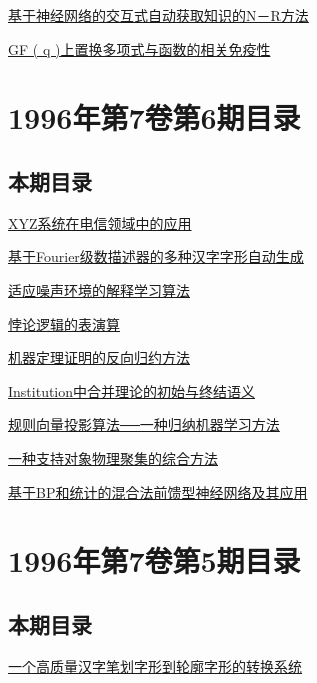 \documentclass[a4paper]{article}
\begin{document}
\href{http://www.jos.org.cn/ch/reader/download_pdf.aspx?file_no=19960708&year_id=1996&quarter_id=7&falg=1}{基于神经网络的交互式自动获取知识的N－R方法}

\href{http://www.jos.org.cn/ch/reader/download_pdf.aspx?file_no=19960709&year_id=1996&quarter_id=7&falg=1}{GF ( q )上置换多项式与函数的相关免疫性}


\section{\textbf{1996年第7卷第6期目录}}
\subsection{本期目录}
\href{http://www.jos.org.cn/ch/reader/download_pdf.aspx?file_no=19960601&year_id=1996&quarter_id=6&falg=1}{XYZ系统在电信领域中的应用}

\href{http://www.jos.org.cn/ch/reader/download_pdf.aspx?file_no=19960602&year_id=1996&quarter_id=6&falg=1}{基于Fourier级数描述器的多种汉字字形自动生成}

\href{http://www.jos.org.cn/ch/reader/download_pdf.aspx?file_no=19960603&year_id=1996&quarter_id=6&falg=1}{适应噪声环境的解释学习算法}

\href{http://www.jos.org.cn/ch/reader/download_pdf.aspx?file_no=19960604&year_id=1996&quarter_id=6&falg=1}{悖论逻辑的表演算}

\href{http://www.jos.org.cn/ch/reader/download_pdf.aspx?file_no=19960605&year_id=1996&quarter_id=6&falg=1}{机器定理证明的反向归约方法}

\href{http://www.jos.org.cn/ch/reader/download_pdf.aspx?file_no=19960606&year_id=1996&quarter_id=6&falg=1}{Institution中合并理论的初始与终结语义}

\href{http://www.jos.org.cn/ch/reader/download_pdf.aspx?file_no=19960607&year_id=1996&quarter_id=6&falg=1}{规则向量投影算法──一种归纳机器学习方法}

\href{http://www.jos.org.cn/ch/reader/download_pdf.aspx?file_no=19960608&year_id=1996&quarter_id=6&falg=1}{一种支持对象物理聚集的综合方法}

\href{http://www.jos.org.cn/ch/reader/download_pdf.aspx?file_no=19960609&year_id=1996&quarter_id=6&falg=1}{基于BP和统计的混合法前馈型神经网络及其应用}


\section{\textbf{1996年第7卷第5期目录}}
\subsection{本期目录}
\href{http://www.jos.org.cn/ch/reader/download_pdf.aspx?file_no=19960501&year_id=1996&quarter_id=5&falg=1}{一个高质量汉字笔划字形到轮廓字形的转换系统}
\end{document}
